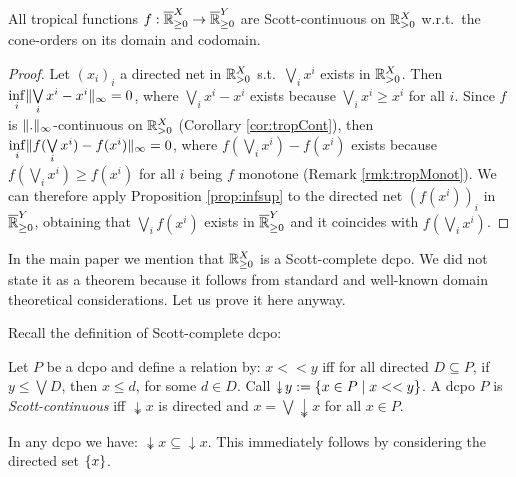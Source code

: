 \begin{proposition}
 All tropical functions $f:\overline{\mathbb{R}}^X_{\geq 0}\to\overline{\mathbb{R}}^Y_{\geq 0}$ are Scott-continuous on $\mathbb{R}^X_{> 0}$ w.r.t.\ the cone-orders on its domain and codomain.
\end{proposition}
\begin{proof}
 Let $(x_i)_i$ a directed net in $\mathbb{R}^X_{> 0}$ s.t.\ $\bigvee\limits_i x^i$ exists in $\mathbb{R}^X_{> 0}$.
 Then $\inf\limits_i \lVert\bigvee\limits_i x^i - x^i\rVert_\infty =0$, where $\bigvee\limits_i x^i - x^i$ exists because $\bigvee\limits_i x^i \geq x^i$ for all $i$.
 Since $f$ is $\lVert.\rVert_\infty$-continuous on $\mathbb{R}^X_{> 0}$ (Corollary \ref{cor:tropCont}), then $\inf\limits_i \lVert f(\bigvee\limits_i x^i) - f(x^i)\rVert_\infty =0$, where $f(\bigvee\limits_i x^i) - f(x^i)$ exists because $f(\bigvee\limits_i x^i) \geq f(x^i)$ for all $i$ being $f$ monotone (Remark \ref{rmk:tropMonot}).
 We can therefore apply Proposition \ref{prop:infsup} to the directed net $(f(x^i))_i$ in $\overline{\mathbb{R}}^Y_{\geq 0}$, obtaining that $\bigvee\limits_i f(x^i)$ exists in $\overline{\mathbb{R}}^Y_{\geq 0}$ and it coincides with $f(\bigvee\limits_i x^i)$.
\end{proof}


In the main paper we mention that $\mathbb{R}_{\geq0}^X$ is a Scott-complete dcpo.
We did not state it as a theorem because it follows from standard and well-known domain theoretical considerations.
Let us prove it here anyway.

Recall the definition of Scott-complete dcpo:

\begin{definition}
 Let $P$ be a dcpo and define a relation by: $x<<y$ iff for all directed $D\subseteq P$, if $y\leq \bigvee D$, then $x\leq d$, for some $d\in D$.
 Call $\twoheaddownarrow y:=\set{x\in P\mid x<<y}$.
 A dcpo $P$ is \emph{Scott-continuous} iff $\twoheaddownarrow x$ is directed and $x=\bigvee\twoheaddownarrow x$ for all $x\in P$.
\end{definition}

\begin{remark}
 In any dcpo we have: $\twoheaddownarrow x \subseteq \downarrow x$.
 This immediately follows by considering the directed set $\{x\}$.
\end{remark}

